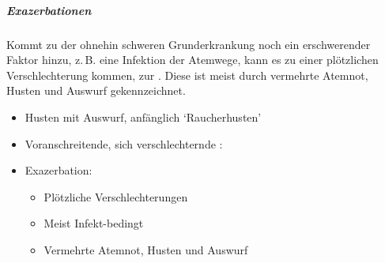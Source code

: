 {\subparagraph{Exazerbationen}
Kommt zu der ohnehin schweren Grunderkrankung noch ein
erschwerender Faktor hinzu, z.\,B. eine Infektion der
Atemwege, kann es zu einer plötzlichen Verschlechterung
kommen, zur . Diese ist meist durch
vermehrte Atemnot, Husten und Auswurf gekennzeichnet.
}{
\begin{itemize}
  \item Husten mit Auswurf, anfänglich
  \protect\enquote*{Raucherhusten}
  \item Voranschreitende, sich verschlechternde :
  \item Exazerbation:
\begin{itemize}
  \item Plötzliche Verschlechterungen
  \item Meist Infekt-bedingt
  \item Vermehrte Atemnot,
  Husten und Auswurf
\end{itemize}
\end{itemize}
}{}{}{}



